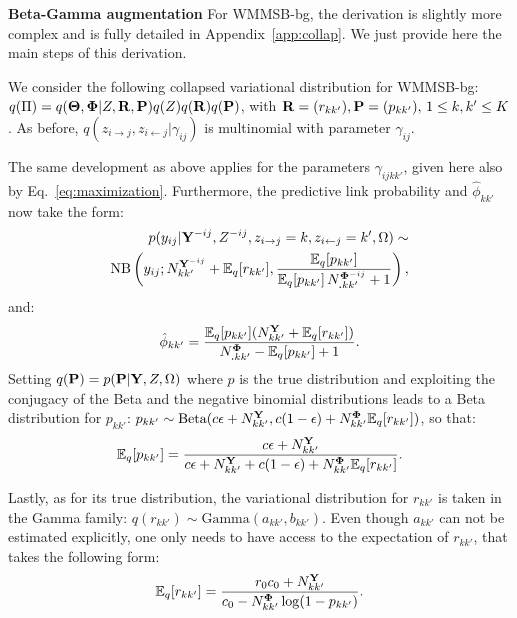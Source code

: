 \textbf{Beta-Gamma augmentation} For WMMSB-bg, the derivation is slightly more complex and is fully detailed in Appendix~\ref{app:collap}. We just provide here the main steps of this derivation.

We consider the following collapsed variational distribution for WMMSB-bg: $q(\Pi) = q({\boldsymbol{\Theta}}, {\boldsymbol{\Phi}}|Z, {\mathbf{R}}, {\mathbf{P}})q(Z)q({\mathbf{R}})q({\mathbf{P}})$,
with ${\mathbf{R}}=(r_{kk'}), {\mathbf{P}}=(p_{kk'}), \, 1 \le k,k' \le K$. As before, $q(z_{i \rightarrow j}, z_{i \leftarrow j}|\gamma_{ij})$ is multinomial with parameter $\gamma_{ij}$.

The same development as above applies for the parameters $\gamma_{ijkk'}$, given here also by Eq.~\ref{eq:maximization}. Furthermore, the predictive link probability and $\hat \phi_{kk'}$ now take the form:
%
\begin{align*}
p(y_{ij} | {\mathbf{Y}}^{-ij}, Z^{- ij}, z_{i\rightarrow j}=k, z_{i\leftarrow j}=k',\Omega) \sim \\
\mathrm{NB}\left(y_{ij}; N^{{\mathbf{Y}}^{-ij}}_{kk'} + \mathbb{E}_{q}[r_{kk'}], \frac{\mathbb{E}_{q}[p_{kk'}]}{\mathbb{E}_{q}[p_{kk'}]\,N^{{\boldsymbol{\Phi}}^{-ij}}_{\bm{.}kk'} + 1} \right),
\end{align*}
%
and:
%
\begin{align*}
\hat \phi_{kk'} = \frac{\mathbb{E}_{q}[p_{kk'}](N^{\mathbf{Y}}_{kk'} + \mathbb{E}_{q}[r_{kk'}])}{N^{{\boldsymbol{\Phi}}}_{\bm{.}kk'} - \mathbb{E}_{q}[p_{kk'}] + 1}.
\end{align*}
%
Setting $q({\mathbf{P}}) = p({\mathbf{P}}|{\mathbf{Y}},Z,\Omega)$ where $p$ is the true distribution and exploiting the conjugacy of the Beta and the negative binomial distributions leads to a Beta distribution for $p_{kk'}$: $p_{kk'} \sim \textrm{Beta}(c\epsilon + N^{\mathbf{Y}}_{kk'}, c(1-\epsilon) + N^{\boldsymbol{\Phi}}_{kk'}\mathbb{E}_{q}[r_{kk'}])$,
so that:
\[
\mathbb{E}_{q}[p_{kk'}] = \frac{c\epsilon + N^{\mathbf{Y}}_{kk'}}{c\epsilon + N^{\mathbf{Y}}_{kk'} + c(1-\epsilon) + N^{\boldsymbol{\Phi}}_{kk'}\mathbb{E}_{q}[r_{kk'}]}.
\]

Lastly, as for its true distribution, the variational distribution for $r_{kk'}$ is taken in the Gamma family:  $q(r_{kk'}) \sim \textrm{Gamma}(a_{kk'},b_{kk'})$. Even though $a_{kk'}$ can not be estimated explicitly, one only needs to have access to the expectation of $r_{kk'}$, that takes the following form:
\[
\mathbb{E}_{q}[r_{kk'}] = \frac{r_0c_0+N^{\mathbf{Y}}_{kk'}}{c_0  -N^{\boldsymbol{\Phi}}_{kk'}\log(1-p_{kk'})}.
\]
%

